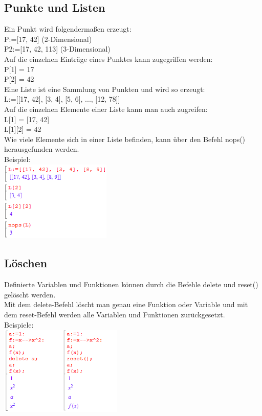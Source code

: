 \documentclass[11pt,final]{scrreprt}
\newcommand{\br} {\medskip\\}
\begin{document}
\subsection{Punkte und Listen}

Ein Punkt wird folgendermaßen erzeugt:\\
P:=[17, 42] (2-Dimensional)\\
P2:=[17, 42, 113] (3-Dimensional)\\
Auf die einzelnen Einträge eines Punktes kann zugegriffen werden:\\
P[1] = 17\\
P[2] = 42\br
Eine Liste ist eine Sammlung von Punkten und wird so erzeugt:\\
L:=[[17, 42], [3, 4], [5, 6], ..., [12, 78]]\\
Auf die einzelnen Elemente einer Liste kann man auch zugreifen:\\
L[1] = [17, 42]\\
L[1][2] = 42\\
Wie viele Elemente sich in einer Liste befinden, kann über den Befehl nops() herausgefunden werden.\br
Beispiel:\\
\includegraphics[width = 200px]{images/listen_1}

\subsection{Löschen}

Definierte Variablen und Funktionen können durch die Befehle delete und reset() gelöscht werden.\\
Mit dem delete-Befehl löscht man genau eine Funktion oder Variable und mit dem reset-Befehl werden alle Variablen und Funktionen zurückgesetzt.\\
Beispiele:\\
\includegraphics[width = 220px]{images/funktionen_2}
\end{document}
